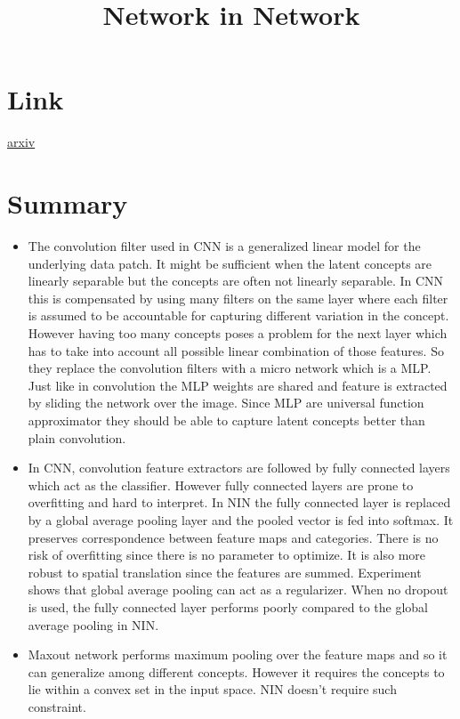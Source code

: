 \documentclass{article}
\title{Network in Network}
\author{}
\date{}
\begin{document}
\maketitle

\section*{Link}
\href{https://arxiv.org/abs/1312.4400}{arxiv} 

\section*{Summary}
\begin{itemize}
\item The convolution filter used in CNN is a generalized linear model for the underlying data patch. It might be sufficient when the latent concepts are linearly separable but the concepts are often not linearly separable. In CNN this is compensated by using many filters on the same layer where each filter is assumed to be accountable for capturing different variation in the concept. However having too many concepts poses a problem for the next layer which has to take into account all possible linear combination of those features. So they replace the convolution filters with a micro network which is a MLP. Just like in convolution the MLP weights are shared and feature is extracted by sliding the network over the image. Since MLP are universal function approximator they should be able to capture latent concepts better than plain convolution.
\item In CNN, convolution feature extractors are followed by fully connected layers which act as the classifier. However fully connected layers are prone to overfitting and hard to interpret. In NIN the fully connected layer is replaced by a global average pooling layer and the pooled vector is fed into softmax. It preserves correspondence between feature maps and categories. There is no risk of overfitting since there is no parameter to optimize. It is also more robust to spatial translation since the features are summed. Experiment shows that global average pooling can act as a regularizer. When no dropout is used, the fully connected layer performs poorly compared to the global average pooling in NIN.
\item Maxout network performs maximum pooling over the feature maps and so it can generalize among different concepts. However it requires the concepts to lie within a convex set in the input space. NIN doesn't require such constraint.
\end{itemize}
\end{document}
